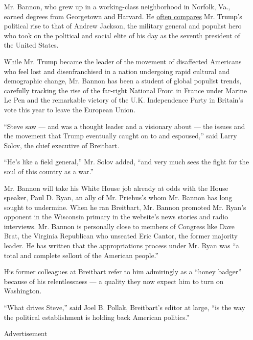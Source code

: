 Mr. Bannon, who grew up in a working-class neighborhood in Norfolk, Va.,
earned degrees from Georgetown and Harvard. He
\href{http://www.breitbart.com/radio/2016/11/02/trump-campaign-ceo-stephen-k-bannon-speaks-with-breitbart-news-daily-to-celebrate-show-anniversary/}{often
compares} Mr. Trump's political rise to that of Andrew Jackson, the
military general and populist hero who took on the political and social
elite of his day as the seventh president of the United States.

While Mr. Trump became the leader of the movement of disaffected
Americans who feel lost and disenfranchised in a nation undergoing rapid
cultural and demographic change, Mr. Bannon has been a student of global
populist trends, carefully tracking the rise of the far-right National
Front in France under Marine Le Pen and the remarkable victory of the
U.K. Independence Party in Britain's vote this year to leave the
European Union.

``Steve saw --- and was a thought leader and a visionary about --- the
issues and the movement that Trump eventually caught on to and
espoused,'' said Larry Solov, the chief executive of Breitbart.

``He's like a field general,'' Mr. Solov added, ``and very much sees the
fight for the soul of this country as a war.''

Mr. Bannon will take his White House job already at odds with the House
speaker, Paul D. Ryan, an ally of Mr. Priebus's whom Mr. Bannon has long
sought to undermine. When he ran Breitbart, Mr. Bannon promoted Mr.
Ryan's opponent in the Wisconsin primary in the website's news stories
and radio interviews. Mr. Bannon is personally close to members of
Congress like Dave Brat, the Virginia Republican who unseated Eric
Cantor, the former majority leader.
\href{http://www.breitbart.com/big-government/2015/12/16/paul-ryan-betrays-america-1-1-trillion-2000-plus-page-omnibus-bill-funds-fundamental-transformation-america/}{He
has written} that the appropriations process under Mr. Ryan was ``a
total and complete sellout of the American people.''

His former colleagues at Breitbart refer to him admiringly as a ``honey
badger'' because of his relentlessness --- a quality they now expect him
to turn on Washington.

``What drives Steve,'' said Joel B. Pollak, Breitbart's editor at large,
``is the way the political establishment is holding back American
politics.''

Advertisement

